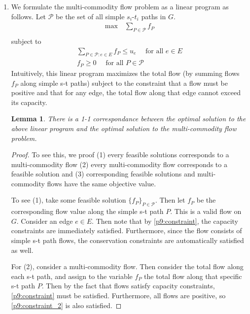 \documentclass[12pt]{exam}
\newtheorem{lemma}[theorem]{Lemma}
\newcommand{\Q}[1]{\question{\large{\textbf{#1}}}}
\begin{document}
\begin{questions}
\newpage
\Q{Problem 9}
\begin{solution}
  \begin{enumerate}[label=(\alph*)]
    \item 
      We formulate the multi-commodity flow problem as a linear program as follows. Let $\mathcal{P}$ be the set of all simple $s_i$-$t_i$ paths in $G$.
      \begin{align}
          \text{max} \quad \sum_{P \in \mathcal{P}} f_P \label{p9:multicommodity_obj} \\
        \end{align}
        subject to
        \begin{align}
          \sum_{P \in \mathcal{P} : e \in E} f_P \leq u_e \quad \text{ for all } e \in E \label{p9:constraint} \\ 
          f_P \geq 0 \quad \text{ for all } P \in \mathcal{P} \label{p9:constraint_2}
        \end{align}
        Intuitively, this linear program maximizes the total flow (by summing flows $f_P$ along simple s-t paths) subject to the constraint that a flow must be positive and that for any edge, the total flow along that edge cannot exceed its capacity.

        \begin{lemma}{}
          There is a 1-1 correspondance between the optimal solution to the above linear program and the optimal solution to the multi-commodity flow problem.
        \end{lemma}
        \begin{proof}
          To see this, we proof (1) every feasible solutions corresponds to a multi-commodity flow (2) every multi-commodity flow corresponds to a feasible solution and (3) corresponding feasible solutions and multi-commodity flows have the same objective value.

          To see (1), take some feasible solution $\{f_P\}_{P \in \mathcal{P}}$. Then let $f_P$ be the corresponding flow value along the simple s-t path $P$. This is a valid flow on $G$. Consider an edge $e \in E$. Then note that by \ref{p9:constraint}, the capacity constraints are immediately satisfied. Furthermore, since the flow consists of simple s-t path flows, the conservation constraints are automatically satisfied as well.


          For (2), consider a multi-commodity flow. Then consider the total flow along each s-t path, and assign to the variable $f_P$ the total flow along that specific s-t path $P$. Then by the fact that flows satisfy capacity constraints, \ref{p9:constraint} must be satisfied. Furthermore, all flows are positive, so \ref{p9:constraint_2} is also satisfied.


\end{proof}
\end{enumerate}
\end{solution}
\end{questions}
\end{document}
